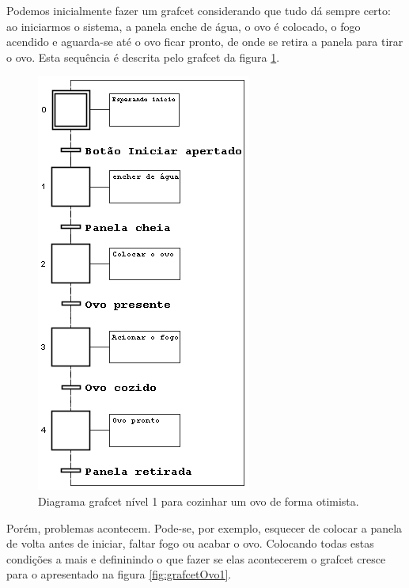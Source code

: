 Podemos inicialmente fazer um grafcet considerando que tudo dá sempre certo: ao iniciarmos o sistema, a panela enche de água, o ovo é colocado, o fogo acendido e aguarda-se até o ovo ficar pronto, de onde se retira a panela para tirar o ovo. Esta sequência é descrita pelo grafcet da figura \ref{fig:grafcetOvoOK}.

\begin{figure}[!h]
\centering
\includegraphics[scale=1]{figuras/ovoOK}
\caption{Diagrama grafcet nível 1 para cozinhar um ovo de forma otimista.}
\label{fig:grafcetOvoOK}
\end{figure}

Porém, problemas acontecem. Pode-se, por exemplo, esquecer de colocar a panela de volta antes de iniciar, faltar fogo ou acabar o ovo. Colocando todas estas condições a mais e defininindo o que fazer se elas acontecerem o grafcet cresce para o apresentado na figura \ref{fig:grafcetOvo1}.

